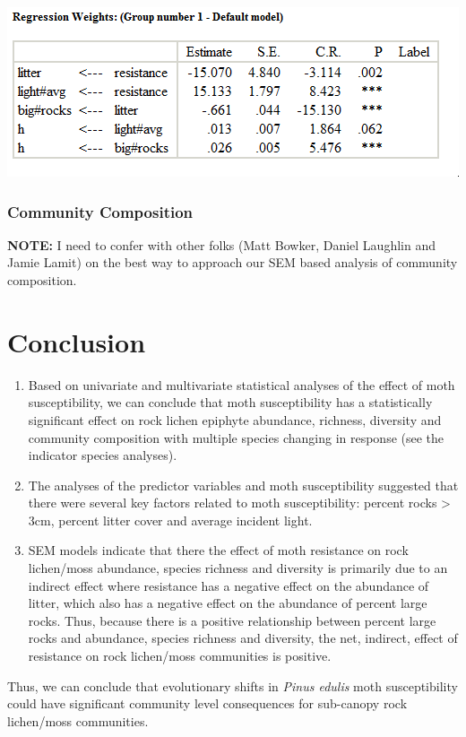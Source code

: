 \documentclass[a4paper]{article}
\begin{document}
\includegraphics[]{H_SEMreg.png}

\subsubsection{Community Composition}

\textbf{NOTE:} I need to confer with other folks (Matt Bowker, Daniel Laughlin and Jamie Lamit) on the best way to approach our SEM based analysis of community composition.


\section{Conclusion}

\begin{enumerate}
\item Based on univariate and multivariate statistical analyses of the effect of moth susceptibility, we can conclude that moth susceptibility has a statistically significant effect on rock lichen epiphyte abundance, richness, diversity and community composition with multiple species changing in response (see the indicator species analyses).
\item The analyses of the predictor variables and moth susceptibility suggested that there were several key factors related to moth susceptibility: percent rocks > 3cm, percent litter cover and average incident light.
\item SEM models indicate that there the effect of moth resistance on rock lichen/moss abundance, species richness and diversity is primarily due to an indirect effect where resistance has a negative effect on the abundance of litter, which also has a negative effect on the abundance of percent large rocks. Thus, because there is a positive relationship between percent large rocks and abundance, species richness and diversity, the net, indirect, effect of resistance on rock lichen/moss communities is positive.
\end{enumerate}

Thus, we can conclude that evolutionary shifts in \textit{Pinus edulis} moth susceptibility could have significant community level consequences for sub-canopy rock lichen/moss communities. 
\end{document}
